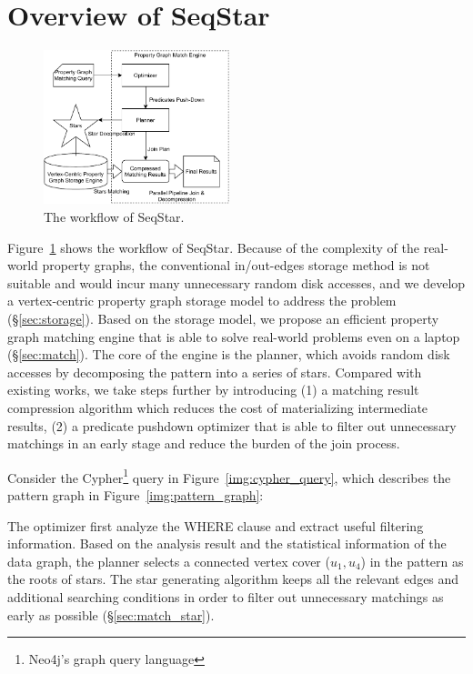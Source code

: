 \section{Overview of SeqStar}\label{sec:framework}
\begin{figure}[ht]
  \centering
  \includegraphics[width=0.48\textwidth]{img/architecture.pdf}
  \caption{The workflow of SeqStar.}\label{img:architecture}
\end{figure}
Figure~\ref{img:architecture} shows the workflow of SeqStar.
Because of the complexity of the real-world property graphs,
the conventional in/out-edges storage method is not suitable and would incur many unnecessary random disk accesses,
and we develop a vertex-centric property graph storage model to address the problem (\S\ref{sec:storage}).
Based on the storage model,
we propose an efficient property graph matching engine that is able to solve real-world problems even on a laptop (\S\ref{sec:match}).
The core of the engine is the planner, which avoids random disk accesses by decomposing the pattern into a series of stars.
Compared with existing works, we take steps further by introducing
(1) a matching result compression algorithm which reduces the cost of materializing intermediate results,
(2) a predicate pushdown optimizer that is able to filter out unnecessary matchings in an early stage and reduce the burden of the join process.

Consider the Cypher\footnote{Neo4j's graph query language} query in Figure~\ref{img:cypher_query},
which describes the pattern graph in Figure~\ref{img:pattern_graph}:

The optimizer first analyze the WHERE clause and extract useful filtering information.
Based on the analysis result and the statistical information of the data graph,
the planner selects a connected vertex cover ($u_1, u_4$) in the pattern as the roots of stars.
The star generating algorithm keeps all the relevant edges and additional searching conditions in order to filter out unnecessary matchings as early as possible (\S\ref{sec:match_star}).

